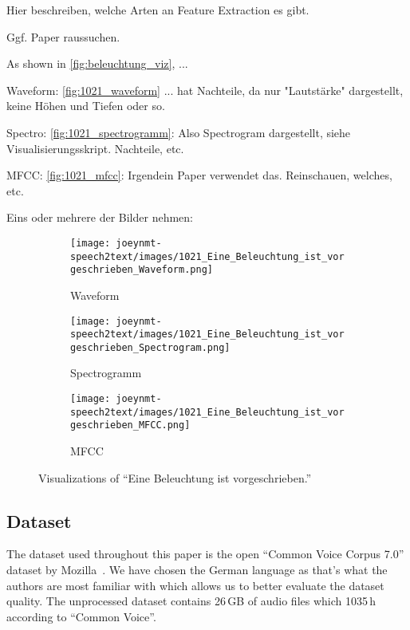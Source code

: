 \documentclass[11pt,a4paper]{article}
\begin{document}
Hier beschreiben, welche Arten an Feature Extraction es gibt.

Ggf. Paper raussuchen.

As shown in \autoref{fig:beleuchtung_viz}, ...

Waveform: \autoref{fig:1021_waveform} ... hat Nachteile, da nur "Lautstärke" dargestellt, keine Höhen und Tiefen oder so.

Spectro: \autoref{fig:1021_spectrogramm}: Also Spectrogram dargestellt, siehe Visualisierungsskript. Nachteile, etc.

MFCC: \autoref{fig:1021_mfcc}: Irgendein Paper verwendet das. Reinschauen, welches, etc.

Eins oder mehrere der Bilder nehmen:

\begin{figure*}[htb]
    \begin{subfigure}[b]{0.32\textwidth}
        \centering
        \texttt{[image: joeynmt-speech2text/images/1021\_Eine\_Beleuchtung\_ist\_vorgeschrieben\_Waveform.png]}
        \caption{Waveform}
        \label{fig:1021_waveform}
    \end{subfigure}
     \hfill
    \begin{subfigure}[b]{0.32\textwidth}
        \centering
        \texttt{[image: joeynmt-speech2text/images/1021\_Eine\_Beleuchtung\_ist\_vorgeschrieben\_Spectrogram.png]}
        \caption{Spectrogramm}
        \label{fig:1021_spectrogramm}
    \end{subfigure}
     \hfill
    \begin{subfigure}[b]{0.32\textwidth}
        \centering
        \texttt{[image: joeynmt-speech2text/images/1021\_Eine\_Beleuchtung\_ist\_vorgeschrieben\_MFCC.png]}
        \caption{MFCC}
        \label{fig:1021_mfcc}
    \end{subfigure}
    \caption{Visualizations of \enquote{Eine Beleuchtung ist vorgeschrieben.}}
    \label{fig:beleuchtung_viz}
\end{figure*}

\subsection{Dataset}

The dataset used throughout this paper is the open \enquote{Common Voice Corpus 7.0} dataset by Mozilla~\cite{commonvoice:2020}.
We have chosen the German language as that's what the authors are most familiar with which allows us to better evaluate the dataset quality.
The unprocessed dataset contains 26\,GB of audio files which 1035\,h according to \enquote{Common Voice}.
\end{document}
